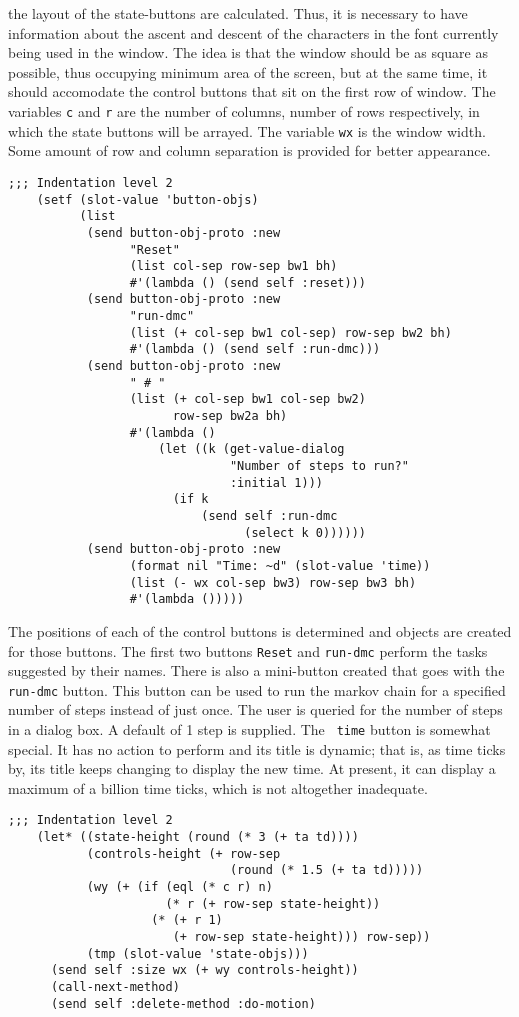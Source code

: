 the layout of the state-buttons are calculated. Thus, it is necessary
to have information about the ascent and descent of the characters in
the font currently being used in the window. The idea is
that the window should be as square as possible, thus occupying
minimum area of the screen, but at the same time, it should accomodate
the control buttons that sit on the first row of window. The variables
{\tt c} and {\tt r} are the number of columns, number of rows
respectively, in which the state buttons will be arrayed. The variable
{\tt wx} is the window width. Some amount of row and column separation
is provided for better appearance. 
\begin{verbatim}
;;; Indentation level 2    
    (setf (slot-value 'button-objs)
          (list 
           (send button-obj-proto :new 
                 "Reset" 
                 (list col-sep row-sep bw1 bh)
                 #'(lambda () (send self :reset)))
           (send button-obj-proto :new 
                 "run-dmc" 
                 (list (+ col-sep bw1 col-sep) row-sep bw2 bh)
                 #'(lambda () (send self :run-dmc)))
           (send button-obj-proto :new 
                 " # " 
                 (list (+ col-sep bw1 col-sep bw2) 
                       row-sep bw2a bh)
                 #'(lambda () 
                     (let ((k (get-value-dialog 
                               "Number of steps to run?" 
                               :initial 1)))
                       (if k 
                           (send self :run-dmc 
                                 (select k 0))))))
           (send button-obj-proto :new 
                 (format nil "Time: ~d" (slot-value 'time))
                 (list (- wx col-sep bw3) row-sep bw3 bh)
                 #'(lambda ()))))
\end{verbatim}
The positions of each of the control buttons is determined and objects
are created for those buttons.  The first two buttons {\tt Reset} and
{\tt run-dmc} perform the tasks suggested by their names. There is
also a mini-button created that goes with the {\tt run-dmc} button.
This button can be used to run the markov chain for a specified number
of steps instead of just once.  The user is queried for the number of
steps in a dialog box. A default of 1 step is supplied. The {\tt
  time} button is somewhat special. It has no action to perform and
its title is dynamic; that is, as time ticks by, its title keeps
changing to display the new time.  At present, it can display a
maximum of a billion time ticks, which is not altogether inadequate.
\begin{verbatim}
;;; Indentation level 2
    (let* ((state-height (round (* 3 (+ ta td))))
           (controls-height (+ row-sep 
                               (round (* 1.5 (+ ta td)))))
           (wy (+ (if (eql (* c r) n)
                      (* r (+ row-sep state-height))
                    (* (+ r 1) 
                       (+ row-sep state-height))) row-sep))
           (tmp (slot-value 'state-objs)))
      (send self :size wx (+ wy controls-height))
      (call-next-method)
      (send self :delete-method :do-motion)
\end{verbatim}
